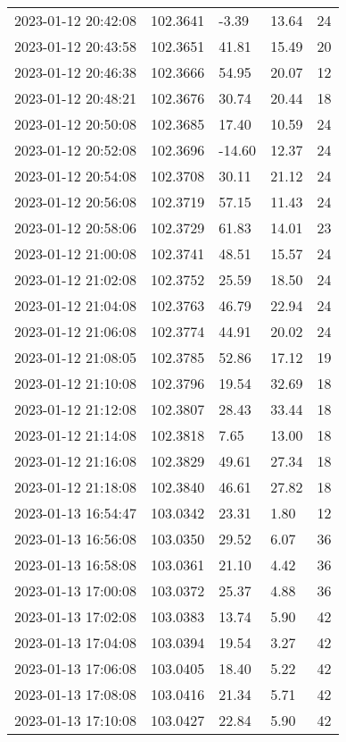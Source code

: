 \documentclass{nature_plusfigure}
\begin{document}
\begin{supplement}
\begin{center}
\begin{longtable}{lllll}
2023-01-12 20:42:08 & 102.3641 & -3.39 & 13.64 & 24 \\ 
2023-01-12 20:43:58 & 102.3651 & 41.81 & 15.49 & 20 \\ 
2023-01-12 20:46:38 & 102.3666 & 54.95 & 20.07 & 12 \\ 
2023-01-12 20:48:21 & 102.3676 & 30.74 & 20.44 & 18 \\ 
2023-01-12 20:50:08 & 102.3685 & 17.40 & 10.59 & 24 \\ 
2023-01-12 20:52:08 & 102.3696 & -14.60 & 12.37 & 24 \\ 
2023-01-12 20:54:08 & 102.3708 & 30.11 & 21.12 & 24 \\ 
2023-01-12 20:56:08 & 102.3719 & 57.15 & 11.43 & 24 \\ 
2023-01-12 20:58:06 & 102.3729 & 61.83 & 14.01 & 23 \\ 
2023-01-12 21:00:08 & 102.3741 & 48.51 & 15.57 & 24 \\ 
2023-01-12 21:02:08 & 102.3752 & 25.59 & 18.50 & 24 \\ 
2023-01-12 21:04:08 & 102.3763 & 46.79 & 22.94 & 24 \\ 
2023-01-12 21:06:08 & 102.3774 & 44.91 & 20.02 & 24 \\ 
2023-01-12 21:08:05 & 102.3785 & 52.86 & 17.12 & 19 \\ 
2023-01-12 21:10:08 & 102.3796 & 19.54 & 32.69 & 18 \\ 
2023-01-12 21:12:08 & 102.3807 & 28.43 & 33.44 & 18 \\ 
2023-01-12 21:14:08 & 102.3818 & 7.65 & 13.00 & 18 \\ 
2023-01-12 21:16:08 & 102.3829 & 49.61 & 27.34 & 18 \\ 
2023-01-12 21:18:08 & 102.3840 & 46.61 & 27.82 & 18 \\ 
2023-01-13 16:54:47 & 103.0342 & 23.31 & 1.80 & 12 \\ 
2023-01-13 16:56:08 & 103.0350 & 29.52 & 6.07 & 36 \\ 
2023-01-13 16:58:08 & 103.0361 & 21.10 & 4.42 & 36 \\ 
2023-01-13 17:00:08 & 103.0372 & 25.37 & 4.88 & 36 \\ 
2023-01-13 17:02:08 & 103.0383 & 13.74 & 5.90 & 42 \\ 
2023-01-13 17:04:08 & 103.0394 & 19.54 & 3.27 & 42 \\ 
2023-01-13 17:06:08 & 103.0405 & 18.40 & 5.22 & 42 \\ 
2023-01-13 17:08:08 & 103.0416 & 21.34 & 5.71 & 42 \\ 
2023-01-13 17:10:08 & 103.0427 & 22.84 & 5.90 & 42 \\ 

\end{longtable}
\end{center}
\end{supplement}
\end{document}
